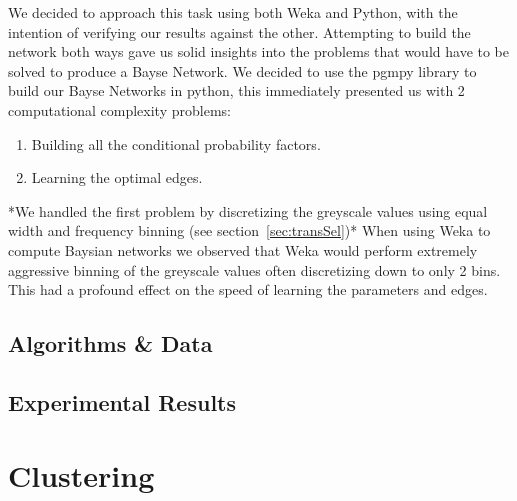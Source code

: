 \documentclass[11pt]{article}
\begin{document}
We decided to approach this task using both Weka and Python, with the intention of verifying our results against the other.
Attempting to build the network both ways gave us solid insights into the problems that would have to be solved to produce a Bayse Network.
We decided to use the pgmpy library to build our Bayse Networks in python, this immediately presented us with 2 computational complexity problems:
\begin{enumerate}
    \item Building all the conditional probability factors.
    \item Learning the optimal edges.
\end{enumerate}

*We handled the first problem by discretizing the greyscale values using equal width and frequency binning (see section~\ref{sec:transSel})*
When using Weka to compute Baysian networks we observed that Weka would perform extremely aggressive binning of the greyscale values often discretizing down to only 2 bins. This had a profound effect on the speed of learning the parameters and edges.

\subsection{Algorithms \& Data}



\subsection{Experimental Results}


\pagebreak

\section{Clustering}
\end{document}
